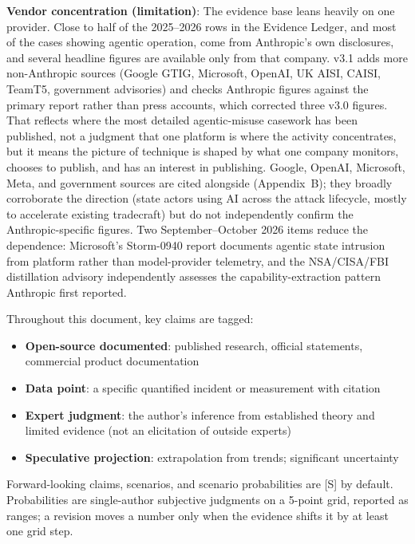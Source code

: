 \documentclass[11pt,letterpaper]{article}
\begin{document}
\textbf{Vendor concentration (limitation)}: The evidence base leans heavily on one provider. Close to half of the 2025--2026 rows in the Evidence Ledger, and most of the cases showing agentic operation, come from Anthropic's own disclosures, and several headline figures are available only from that company. v3.1 adds more non-Anthropic sources (Google GTIG, Microsoft, OpenAI, UK AISI, CAISI, TeamT5, government advisories) and checks Anthropic figures against the primary report rather than press accounts, which corrected three v3.0 figures. That reflects where the most detailed agentic-misuse casework has been published, not a judgment that one platform is where the activity concentrates, but it means the picture of technique is shaped by what one company monitors, chooses to publish, and has an interest in publishing. Google, OpenAI, Microsoft, Meta, and government sources are cited alongside (Appendix~B); they broadly corroborate the direction (state actors using AI across the attack lifecycle, mostly to accelerate existing tradecraft) but do not independently confirm the Anthropic-specific figures. Two September--October 2026 items reduce the dependence: Microsoft's Storm-0940 report documents agentic state intrusion from platform rather than model-provider telemetry, and the NSA/CISA/FBI distillation advisory independently assesses the capability-extraction pattern Anthropic first reported.

\begin{defbox}
Throughout this document, key claims are tagged:
\begin{itemize}[leftmargin=2.2em, labelwidth=1.8em, itemsep=0.3em]
  \item[\textbf{[O]}] \textbf{Open-source documented}: published research, official statements, commercial product documentation
  \item[\textbf{[D]}] \textbf{Data point}: a specific quantified incident or measurement with citation
  \item[\textbf{[E]}] \textbf{Expert judgment}: the author's inference from established theory and limited evidence (not an elicitation of outside experts)
  \item[\textbf{[S]}] \textbf{Speculative projection}: extrapolation from trends; significant uncertainty
\end{itemize}
Forward-looking claims, scenarios, and scenario probabilities are [S] by default. Probabilities are single-author subjective judgments on a 5-point grid, reported as ranges; a revision moves a number only when the evidence shifts it by at least one grid step.
\end{defbox}
\end{document}
